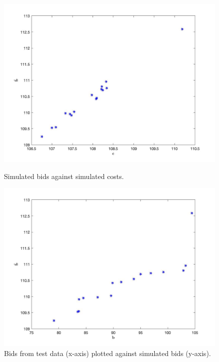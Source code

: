 \documentclass[11pt]{article}
\begin{document}
\begin{figure}
\centering 
    \begin{minipage}[h]{0.55\textwidth}
        \centering
        \includegraphics[width=1\linewidth]{simulated_bids.jpg}
        \caption{Simulated bids against simulated costs.}
        \label{fig:simulation}
    \end{minipage}%
    \begin{minipage}[h]{0.55\textwidth}
        \centering
        \includegraphics[width=1\linewidth]{actualVsimulated.jpg}
        \caption{Bids from test data (x-axis) plotted 
        against simulated bids (y-axis).}
        \label{fig:actualVsimulation}
    \end{minipage}
\end{figure}
\end{document}
